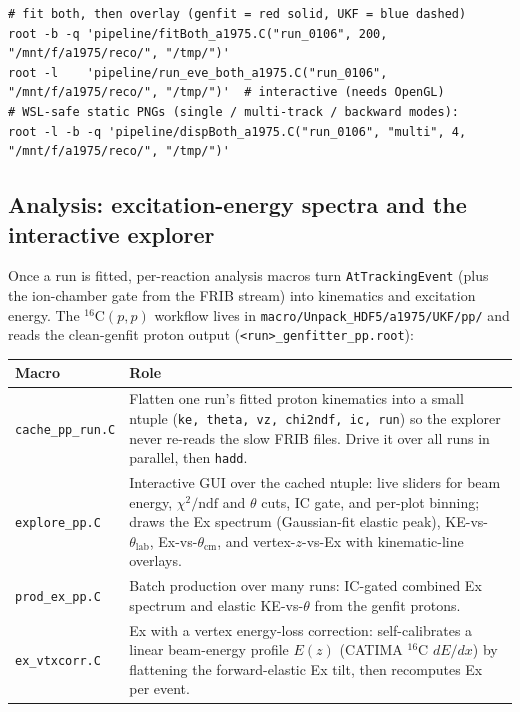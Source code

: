 \documentclass[11pt,a4paper]{article}
\newcommand{\code}[1]{\texttt{\small #1}}
\newcommand{\file}[1]{\texttt{\small #1}}
\begin{document}
\begin{lstlisting}[style=bash]
# fit both, then overlay (genfit = red solid, UKF = blue dashed)
root -b -q 'pipeline/fitBoth_a1975.C("run_0106", 200, "/mnt/f/a1975/reco/", "/tmp/")'
root -l    'pipeline/run_eve_both_a1975.C("run_0106", "/mnt/f/a1975/reco/", "/tmp/")'  # interactive (needs OpenGL)
# WSL-safe static PNGs (single / multi-track / backward modes):
root -l -b -q 'pipeline/dispBoth_a1975.C("run_0106", "multi", 4, "/mnt/f/a1975/reco/", "/tmp/")'
\end{lstlisting}

\subsection{Analysis: excitation-energy spectra and the interactive explorer}
\label{sec:analysis}

Once a run is fitted, per-reaction analysis macros turn \code{AtTrackingEvent}
(plus the ion-chamber gate from the FRIB stream) into kinematics and excitation
energy. The $^{16}$C$(p,p)$ workflow lives in \file{macro/Unpack\_HDF5/a1975/UKF/pp/}
and reads the clean-genfit proton output (\file{<run>\_genfitter\_pp.root}):

\begin{longtable}{@{}p{3.2cm} p{11.4cm}@{}}
\toprule
\textbf{Macro} & \textbf{Role} \\
\midrule
\endhead
\file{cache\_pp\_run.C} & Flatten one run's fitted proton kinematics into a small
ntuple (\code{ke, theta, vz, chi2ndf, ic, run}) so the explorer never re-reads the
slow FRIB files. Drive it over all runs in parallel, then \code{hadd}. \\
\file{explore\_pp.C}    & Interactive GUI over the cached ntuple: live sliders for
beam energy, $\chi^2/\mathrm{ndf}$ and $\theta$ cuts, IC gate, and per-plot binning;
draws the Ex spectrum (Gaussian-fit elastic peak), KE-vs-$\theta_\mathrm{lab}$,
Ex-vs-$\theta_\mathrm{cm}$, and vertex-$z$-vs-Ex with kinematic-line overlays. \\
\file{prod\_ex\_pp.C}   & Batch production over many runs: IC-gated combined Ex
spectrum and elastic KE-vs-$\theta$ from the genfit protons. \\
\file{ex\_vtxcorr.C}    & Ex with a vertex energy-loss correction: self-calibrates a
linear beam-energy profile $E(z)$ (CATIMA $^{16}$C $dE/dx$) by flattening the
forward-elastic Ex tilt, then recomputes Ex per event. \\
\bottomrule
\end{longtable}
\end{document}
